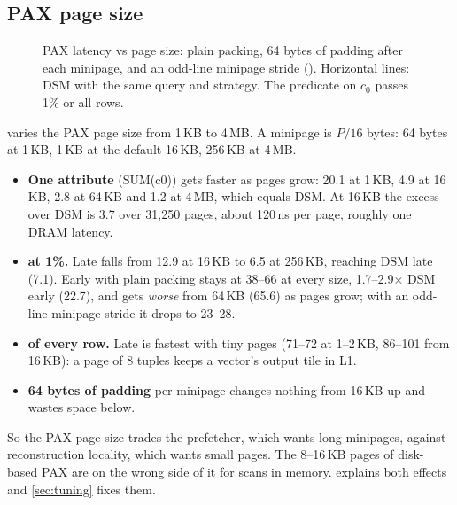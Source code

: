\subsection{PAX page size}
\label{sec:res:pax}

\begin{figure}[t]
\centering
{}
\caption{PAX latency vs page size: plain packing, 64 bytes of padding after each minipage,
and an odd-line minipage stride (). Horizontal lines: DSM with the same
query and strategy. The predicate on $c_0$ passes 1\% or all rows.}
\label{fig:pax}
\end{figure}

 varies the PAX page size from 1\,KB to 4\,MB. A minipage is $P/16$ bytes: 64
bytes at 1\,KB, 1\,KB at the default 16\,KB, 256\,KB at 4\,MB.
\begin{itemize}
\item \textbf{One attribute} (SUM(c0)) gets faster as pages grow: 20.1\ms{} at 1\,KB, 4.9 at
16\,KB, 2.8 at 64\,KB and 1.2 at 4\,MB, which equals DSM. At 16\,KB the excess over DSM is
3.7\ms{} over 31{,}250 pages, about 120\,ns per page, roughly one DRAM latency.
\item \textbf{ at 1\%.} Late falls from 12.9\ms{} at 16\,KB to 6.5\ms{} at
256\,KB, reaching DSM late (7.1\ms). Early with plain packing stays at 38--66\ms{} at every
size, 1.7--2.9$\times$ DSM early (22.7\ms), and gets \emph{worse} from 64\,KB (65.6\ms) as
pages grow; with an odd-line minipage stride it drops to 23--28\ms.
\item \textbf{ of every row.} Late is fastest with tiny pages (71--72\ms{} at
1--2\,KB, 86--101\ms{} from 16\,KB): a page of 8 tuples keeps a vector's output tile in L1.
\item \textbf{64 bytes of padding} per minipage changes nothing from 16\,KB up and wastes
space below.
\end{itemize}
So the PAX page size trades the prefetcher, which wants long minipages, against
reconstruction locality, which wants small pages. The 8--16\,KB pages of disk-based PAX are on
the wrong side of it for scans in memory.  explains both effects and
\cref{sec:tuning} fixes them.
